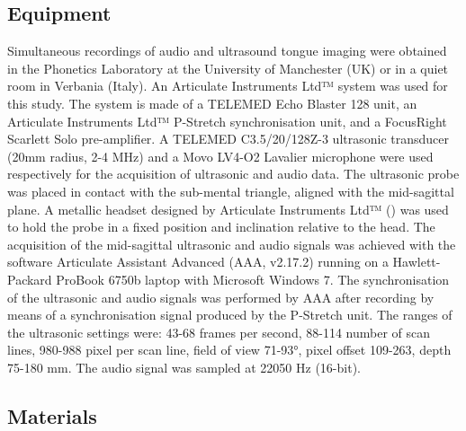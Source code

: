 \documentclass[
  12pt,
]{article}
\begin{document}
\hypertarget{equipment}{%
\subsection{Equipment}\label{equipment}}

\label{s:equipment}

Simultaneous recordings of audio and ultrasound tongue imaging were
obtained in the Phonetics Laboratory at the University of Manchester
(UK) or in a quiet room in Verbania (Italy). An Articulate Instruments
Ltd™ system was used for this study. The system is made of a TELEMED
Echo Blaster 128 unit, an Articulate Instruments Ltd™ P-Stretch
synchronisation unit, and a FocusRight Scarlett Solo pre-amplifier. A
TELEMED C3.5/20/128Z-3 ultrasonic transducer (20mm radius, 2-4 MHz) and
a Movo LV4-O2 Lavalier microphone were used respectively for the
acquisition of ultrasonic and audio data. The ultrasonic probe was
placed in contact with the sub-mental triangle, aligned with the
mid-sagittal plane. A metallic headset designed by Articulate
Instruments Ltd™ (\citeyear{articulate2008}) was used to hold the probe
in a fixed position and inclination relative to the head. The
acquisition of the mid-sagittal ultrasonic and audio signals was
achieved with the software Articulate Assistant Advanced (AAA, v2.17.2)
running on a Hawlett-Packard ProBook 6750b laptop with Microsoft Windows
7. The synchronisation of the ultrasonic and audio signals was performed
by AAA after recording by means of a synchronisation signal produced by
the P-Stretch unit. The ranges of the ultrasonic settings were: 43-68
frames per second, 88-114 number of scan lines, 980-988 pixel per scan
line, field of view 71-93°, pixel offset 109-263, depth 75-180 mm. The
audio signal was sampled at 22050 Hz (16-bit).

\hypertarget{materials}{%
\subsection{Materials}\label{materials}}
\end{document}
